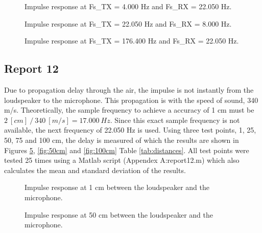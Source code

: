 \documentclass[final]{scrreprt} %
\begin{document}
\begin{figure}[H]
	\centering
	\setlength\figureheight{4cm}
    	\setlength{}
	
	\caption{Impulse response at Fs\_TX = 4.000 Hz and Fs\_RX = 22.050 Hz.}
	\label{fig:response_2}
\end{figure}

\begin{figure}[H]
	\centering
	\setlength\figureheight{4cm}
    	\setlength{}
	
	\caption{Impulse response at Fs\_TX = 22.050 Hz and Fs\_RX = 8.000 Hz.}
	\label{fig:response_3}
\end{figure}

\begin{figure}[H]
	\centering
	\setlength\figureheight{4cm}
    	\setlength{}
	
	\caption{Impulse response at Fs\_TX = 176.400 Hz and Fs\_RX = 22.050 Hz.}
	\label{fig:highest_freq}
\end{figure}

\subsection{Report 12}
Due to propagation delay through the air, the impulse is not instantly from the loudspeaker to the microphone.
This propagation is with the speed of sound, 340 m/s.
Theoretically, the sample frequency to achieve a accuracy of 1 cm must be $2 ~[cm] ~/~ 340 ~[m/s] = 17.000 ~ Hz$.
Since this exact sample frequency is not available, the next frequency of 22.050 Hz is used.
Using three test points, 1, 25, 50, 75 and 100 cm, the delay is measured of which the results are shown in Figures \ref{fig:1cm}, \ref{fig:50cm} and \ref{fig:100cm} Table \ref{tab:distances}.
All test points were tested 25 times using a Matlab script (Appendex A:report12.m) which also calculates the mean and standard deviation of the results.

\begin{figure}[H]
	\centering
	\setlength\figureheight{4cm}
    	\setlength{}
	
	\caption{Impulse response at 1 cm between the loudspeaker and the microphone.}
	\label{fig:1cm}
\end{figure}

\begin{figure}[H]
	\centering
	\setlength\figureheight{4cm}
    	\setlength{}
	
	\caption{Impulse response at 50 cm between the loudspeaker and the microphone.}
	\label{fig:1cm}
\end{figure}
\end{document}
